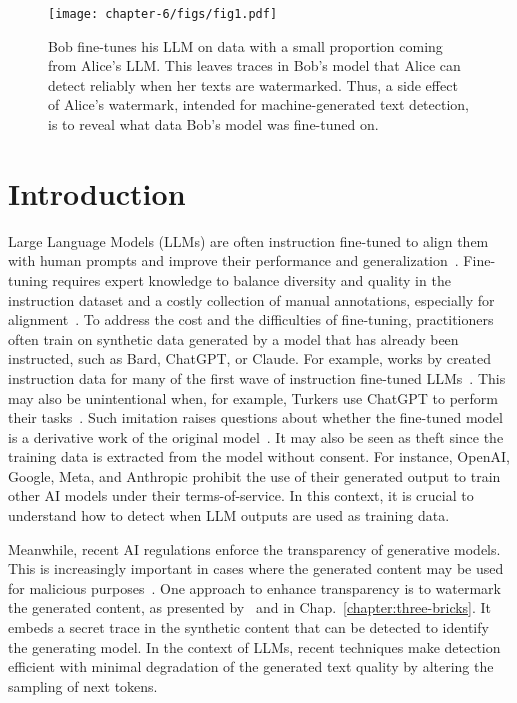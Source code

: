 

\begin{figure*}[t]
    \centering
    \texttt{[image: chapter-6/figs/fig1.pdf]}
    \captionsetup{font=small}
    \caption{
    Bob fine-tunes his LLM on data with a small proportion coming from Alice's LLM.
    This leaves traces in Bob's model that Alice can detect reliably when her texts are watermarked.
    Thus, a side effect of Alice's watermark, intended for machine-generated text detection, is to reveal what data Bob's model was fine-tuned on.
    }
    \label{chap6/fig:fig1}
\end{figure*}

\section{Introduction}

Large Language Models (LLMs) are often instruction fine-tuned to align them with human prompts and improve their performance and generalization~\citep{ouyang2022training, wei2022finetuned, chung2022scaling}.
Fine-tuning requires expert knowledge to balance diversity and quality in the instruction dataset and a costly collection of manual annotations, especially for alignment~\citep{openai2023gpt, touvron2023llama2, team2023gemini}.
To address the cost and the difficulties of fine-tuning, practitioners often train on synthetic data generated by a model that has already been instructed, such as Bard, ChatGPT, or Claude. 
For example, works by \citet{wang2022self, honovich2022unnatural, peng2023instruction} created instruction data for many of the first wave of instruction fine-tuned LLMs~\citep{alpaca, xu2023baize, gunasekar2023textbooks, mukherjee2023orca}. 
This may also be unintentional when, for example, Turkers use ChatGPT to perform their tasks~\citep{veselovsky2023artificial}.
Such imitation raises questions about whether the fine-tuned model is a derivative work of the original model~\citep{wallace2020imitation}. 
It may also be seen as theft since the training data is extracted from the model without consent. 
For instance, OpenAI, Google, Meta, and Anthropic prohibit the use of their generated output to train other AI models under their terms-of-service.
In this context, it is crucial to understand how to detect when LLM outputs are used as training data.


Meanwhile, recent AI regulations enforce the transparency of generative models.
This is increasingly important in cases where the generated content may be used for malicious purposes~\citep{weidinger2022taxonomy, crothers2022machine}.
One approach to enhance transparency is to watermark the generated content, as presented by~\citet{aaronson2023watermarking,kirchenbauer2023watermark, kirchenbauer2023reliability} and in Chap.~\ref{chapter:three-bricks}.
It embeds a secret trace in the synthetic content that can be detected to identify the generating model.
In the context of LLMs, recent techniques make detection efficient with minimal degradation of the generated text quality by altering the sampling of next tokens.

